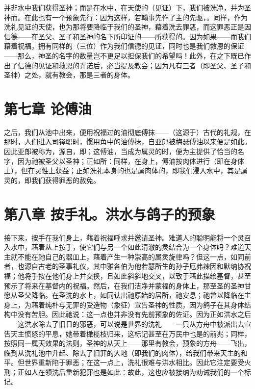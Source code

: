 并非水中我们获得圣神；而是在水中，在天使的（见证）下，我们被洗净，并为圣神而。在此也有一个预象先行：因为这样，若翰事先作了主的先驱，。同样，作为洗礼见证的天使，也为那将要降临于我们的圣神，藉着洗去罪恶，而这罪恶正是因信德——在圣父、圣子和圣神的名下所印证的——所获得的。因为如果——而我们藉着祝福，拥有同样的（三位）作为我们信德的见证，同时也是我们救恩的保证——那么，神圣的名字的数量岂不更足以担保我们的希望吗！此外，在之下既已作出了信德的见证和救恩的许诺后，必当提及教会；因为凡有三者（即圣父、圣子和圣神）之处，就有教会，那是三者的身体。\par


\section{第七章 论傅油}

之后，我们从池中出来，便用祝福过的油彻底傅抹——（这源于）古代的礼规，在那时，人们进入司铎职时，惯用角中的油傅抹，自亚郎被梅瑟傅油以来便是如此。因此亚郎被称为，源自，即；这傅油，当成为属灵的时，便为主提供了恰当的名字，因为祂被圣父以圣神；正如所：同样，在身上，傅油按肉体进行（即在身体上），但在灵性上获益；正如洗礼本身的也是属肉体的，即我们浸入水中，其是属灵的，即我们获得罪恶的赦免。\par


\section{第八章  按手礼。洪水与鸽子的预象}

接下来，按手在我们身上，藉着祝福呼求并邀请圣神。难道人的聪明能将一个灵召入水中，藉着从上按手，使它们与另一个如此清澈的灵结合为一个身体吗？难道天主就不能在祂自己的器皿上，藉着产生一种崇高的属灵旋律吗？但这一点，如同前者，也源自古老的圣事礼仪，其中雅各伯为他若瑟所生的孙子厄弗辣因和默纳协祝福；他将手按在他们身上并交换，且如此斜斜地交叉，以致于藉此描绘基督，甚至预示了将来在基督内的祝福。然后，在我们洁净并蒙福的身体上，那至圣的圣神甘愿从圣父降临。在圣洗的水上，如同认出祂原始的居所，祂安息；祂曾以降临在主身上，为藉着纯朴与无罪的受造物（象征）宣告圣神的性质，因为鸽子在其身体结构中没有苦胆。因此祂说：这一点也并非没有先前预象的佐证。因为正如洪水之后——这洪水除去了旧日的邪恶，可以说是世界的洗礼——一只从方舟中被派出去宣告天主愤怒的平息，她带着橄榄枝归来，这标记甚至在万民中也是的前兆；同样，按照同一属天效果的法则，圣神的从天上——那里有教会，预象的方舟——飞出，临到从洗礼池中升起、除去了旧罪的大地（即我们的肉体），给我们带来天主的和平。但世界重新陷于罪恶；在这一点上，洗礼很难与洪水相比。因此它注定要受火刑；正如人在领洗后重新犯罪也是如此：故此，这也应被接纳为劝诫我们的一个标记。\par

